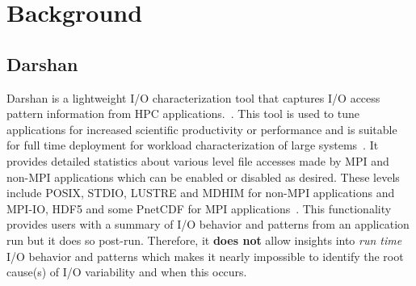 \section{Background}
\label{sec:background}
\subsection{Darshan}
Darshan is a lightweight I/O characterization tool that captures I/O access pattern information from HPC applications.~\cite{Darshan}.
This tool is used to tune applications for increased scientific productivity or performance and is suitable for full time deployment for workload characterization of large systems~\cite{darshan-webpage}. It provides detailed statistics about various level file accesses made by MPI and non-MPI applications which can be enabled or disabled as desired. These levels include POSIX, STDIO, LUSTRE and MDHIM for non-MPI applications and MPI-IO, HDF5 and some PnetCDF for MPI applications~\cite{darshan-runtime}. This functionality provides users with a summary of I/O behavior and patterns from an application run but it does so post-run. Therefore, it \textbf{does not} allow insights into \emph{run time} I/O behavior and patterns which makes it nearly impossible to identify the root cause(s) of I/O variability and when this occurs. 

